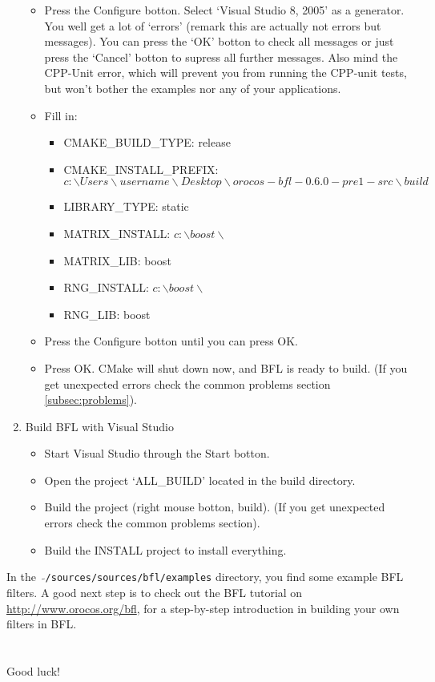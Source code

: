 \documentclass[a4paper,10pt]{article}
\begin{document}
\begin{enumerate}
\begin{itemize}
	\item Press the Configure botton. Select `Visual Studio 8, 2005' as a generator.
	 You well get a lot of `errors' (remark this are actually not errors but messages). You can press the `OK' botton to check all messages or just press the `Cancel' botton to supress all further messages. Also mind the CPP-Unit error, which will prevent you from running the CPP-unit tests, but won't bother the examples nor any of your applications.
	 \item Fill in:
		\begin{itemize}
		\item CMAKE\_BUILD\_TYPE: release
		\item CMAKE\_INSTALL\_PREFIX: $ c:\backslash Users \backslash username \backslash Desktop \backslash orocos-bfl-0.6.0-pre1-src \backslash build$
		\item LIBRARY\_TYPE: static
		\item MATRIX\_INSTALL: $ c:\backslash boost \backslash$
		\item MATRIX\_LIB: boost
		\item RNG\_INSTALL: $ c:\backslash boost \backslash$
		\item RNG\_LIB: boost
		\end{itemize}
	\item Press the Configure botton until you can press OK.
	\item Press OK. CMake will shut down now, and BFL is ready to build. (If you get unexpected errors check the common problems section \ref{subsec:problems}).
	\end{itemize}
\item Build BFL with Visual Studio
	\begin{itemize}
	\item Start Visual Studio through the Start botton.
	\item Open the project `ALL\_BUILD' located in the build directory.
	\item Build the project (right mouse botton, build). (If you get unexpected errors check the common problems section).
	\item Build the INSTALL project to install everything.
	\end{itemize}
\end{enumerate}

In the \ $\mathtt{\tilde{ }}$\texttt{/sources/sources/bfl/examples} directory, you find some example BFL
filters. A good next step is to check out the BFL tutorial on
\url{http://www.orocos.org/bfl}, for a step-by-step introduction in building
your own filters in BFL.
\\\\\\
Good luck!
\end{document}

